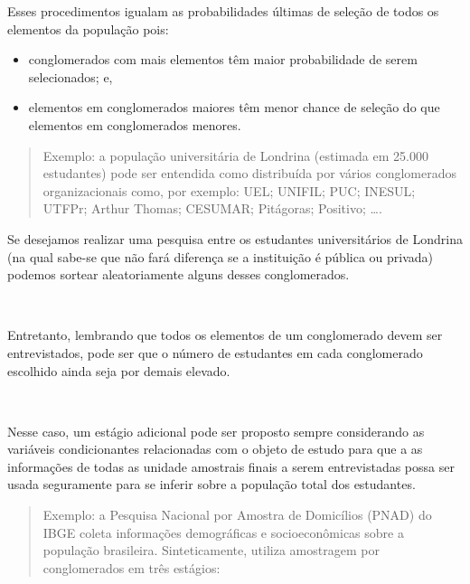 \documentclass[
]{book}
\providecommand{\tightlist}{%
  \setlength{\itemsep}{0pt}\setlength{\parskip}{0pt}}
\begin{document}
\hfill\break

Esses procedimentos igualam as probabilidades últimas de seleção de todos os elementos da população pois:

\hfill\break

\begin{itemize}
\tightlist
\item
  conglomerados com mais elementos têm maior probabilidade de serem selecionados; e,
\item
  elementos em conglomerados maiores têm menor chance de seleção do que elementos em conglomerados menores.
\end{itemize}

\hfill\break

\begin{quote}
Exemplo: a população universitária de Londrina (estimada em 25.000 estudantes) pode ser entendida como distribuída por vários conglomerados organizacionais como, por exemplo: UEL; UNIFIL; PUC; INESUL; UTFPr; Arthur Thomas; CESUMAR; Pitágoras; Positivo; \ldots.
\end{quote}

\hfill\break

Se desejamos realizar uma pesquisa entre os estudantes universitários de Londrina (na qual sabe-se que não fará diferença se a instituição é pública ou privada) podemos sortear aleatoriamente alguns desses conglomerados.

~

Entretanto, lembrando que todos os elementos de um conglomerado devem ser entrevistados, pode ser que o número de estudantes em cada conglomerado escolhido ainda seja por demais elevado.

~

Nesse caso, um estágio adicional pode ser proposto sempre considerando as variáveis condicionantes relacionadas com o objeto de estudo para que a as informações de todas as unidade amostrais finais a serem entrevistadas possa ser usada seguramente para se inferir sobre a população total dos estudantes.

\hfill\break

\begin{quote}
Exemplo: a Pesquisa Nacional por Amostra de Domicílios (PNAD) do IBGE coleta informações demográficas e socioeconômicas sobre a população brasileira. Sinteticamente, utiliza amostragem por conglomerados em três estágios:
\end{quote}

\hfill\break
\end{document}

